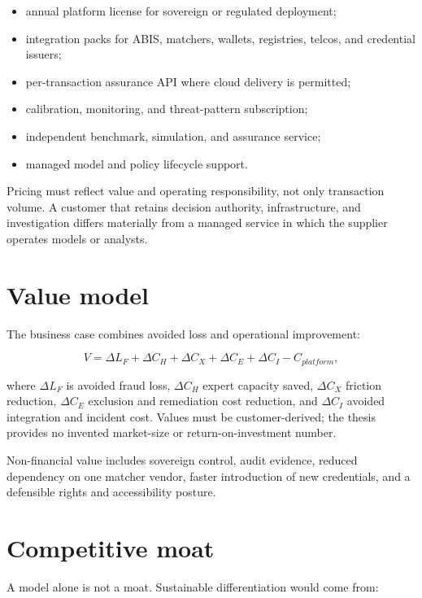 \begin{itemize}
\item annual platform license for sovereign or regulated deployment;
\item integration packs for ABIS, matchers, wallets, registries, telcos, and credential issuers;
\item per-transaction assurance API where cloud delivery is permitted;
\item calibration, monitoring, and threat-pattern subscription;
\item independent benchmark, simulation, and assurance service;
\item managed model and policy lifecycle support.
\end{itemize}

Pricing must reflect value and operating responsibility, not only transaction volume. A customer that retains decision authority, infrastructure, and investigation differs materially from a managed service in which the supplier operates models or analysts.

\section{Value model}

The business case combines avoided loss and operational improvement:

\begin{equation}
V=\Delta L_F+\Delta C_H+\Delta C_X+\Delta C_E+\Delta C_I-C_{platform},
\end{equation}

where $\Delta L_F$ is avoided fraud loss, $\Delta C_H$ expert capacity saved, $\Delta C_X$ friction reduction, $\Delta C_E$ exclusion and remediation cost reduction, and $\Delta C_I$ avoided integration and incident cost. Values must be customer-derived; the thesis provides no invented market-size or return-on-investment number.

Non-financial value includes sovereign control, audit evidence, reduced dependency on one matcher vendor, faster introduction of new credentials, and a defensible rights and accessibility posture.

\section{Competitive moat}

A model alone is not a moat. Sustainable differentiation would come from:

